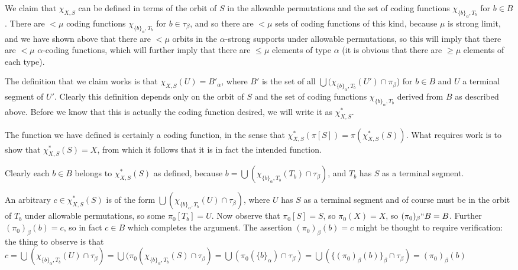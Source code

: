\documentclass[112pt]{article}
\begin{document}
\begin{description}
We claim that $\chi_{X,S}$ can be defined in terms of the orbit of $S$ in the allowable permutations and the set of coding functions $\chi_{\{b\}_\alpha,T_b}$ for $b \in B$.  There are $<\mu$ coding functions $\chi_{\{b\}_\alpha,T_b}$ for $b \in \tau_\beta$, and so there are $<\mu$ sets of coding functions of this kind, because $\mu$ is strong limit, and we have shown above that there are $<\mu$ orbits in the $\alpha$-strong supports under allowable permutations, so this will imply that there are $<\mu$ $\alpha$-coding functions, which will further imply that there are $\leq \mu$ elements of type $\alpha$ (it is obvious that there are $\geq \mu$ elements of each type).


The definition that we claim works is that $\chi_{X,S}(U) = B'_\alpha$, where $B'$ is the set of all $\bigcup (\chi_{\{b\}_\alpha,T_b}(U')\cap \pi_\beta$) for $b \in B$ and $U$ a terminal segment of  $U'$.  Clearly this definition depends only on the orbit of $S$ and the set of coding functions $\chi_{\{b\}_\alpha,T_b}$ derived from $B$ as described above.  Before we know that this is actually the coding function desired, we will write it as $\chi_{X,S}^*$.

The function we have defined is certainly a coding function, in the sense that $\chi_{X,S}^*(\pi[S]) = \pi(\chi_{X,S}^*(S))$.  What requires work is to show that
$\chi_{X,S}^*(S)=X$, from which it follows that it is in fact the intended function.

Clearly each $b \in B$ belongs to $\chi^*_{X,S}(S)$ as defined, because \newline $b = \bigcup (\chi_{\{b\}_\alpha,T_b}(T_b)\cap \tau_{\beta})$, and $T_b$ has $S$ as a terminal segment.

An arbitrary $c \in \chi_{X,S}^*(S)$ is of the form $\bigcup (\chi_{\{b\}_\alpha,T_b}(U)\cap \tau_{\beta})$, where $U$ has $S$ as a terminal segment and of course must be in the orbit of $T_b$ under allowable permutations, so some $\pi_0[T_b] = U$. Now observe that $\pi_0[S]=S$, so $\pi_0(X)=X$, so
$(\pi_0)_\beta``B=B$.  Further $(\pi_0)_\beta(b) = c$, so in fact $c \in B$ which completes the argument.  The assertion $(\pi_0)_\beta(b) = c$ might be thought to require verification:   the thing to observe is that $c=\bigcup (\chi_{\{b\}_\alpha,T_b}(U) \cap \tau_\beta)=\bigcup(\pi_0(\chi_{\{b\}_\alpha,T_b}(S)\cap \tau_\beta)=
\bigcup (\pi_0(\{b\}_\alpha)\cap \tau_\beta) =\bigcup(\{(\pi_0)_\beta(b)\}_\beta \cap \tau_\beta) = (\pi_0)_\beta(b)$


\end{description}
\end{document}
